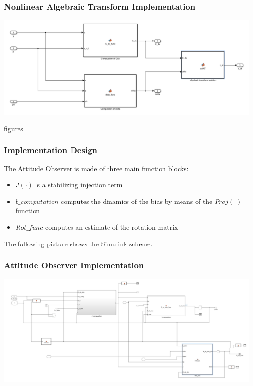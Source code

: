 \documentclass{beamer}
\begin{document}
		\begin{frame}
			\frametitle{Nonlinear Algebraic Transform Implementation}
			\includegraphics[scale = 0.24]{NLAT}
		\end{frame}
		
		\begin{frame}
			figures
		\end{frame}
		
		
	\begin{frame}
		\frametitle{Implementation Design}
		The Attitude Observer is made of three main function blocks:\\
		\begin{itemize}
			\item $J(\cdot) $ is a stabilizing injection term
			
			\item $b\_computation$ computes the dinamics of the bias by means of the $Proj(\cdot)$ function
			
			\item $Rot\_func$ computes an estimate of the rotation matrix
		\end{itemize}
		
	\end{frame}
	
	\begin{frame}
		The following picture shows the Simulink scheme:
		\frametitle{Attitude Observer Implementation}
		\includegraphics[scale=0.24]{at}
	\end{frame}
\end{document}
